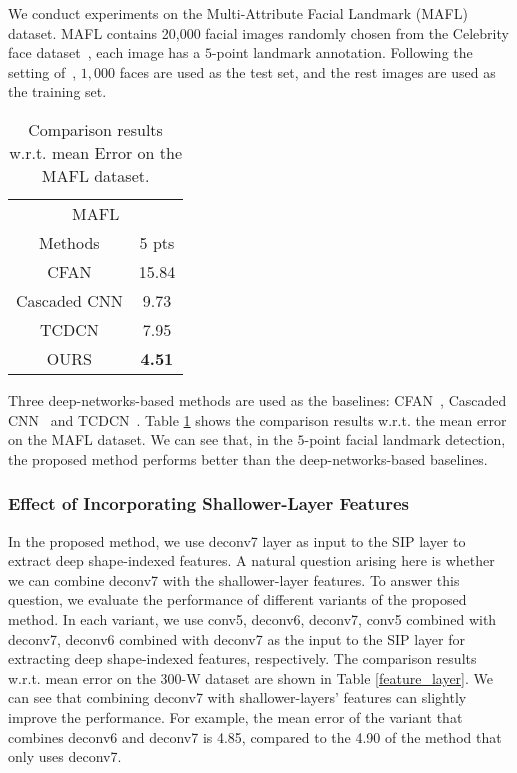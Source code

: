 \documentclass[journal]{IEEEtran}
\begin{document}
We conduct experiments on the Multi-Attribute Facial Landmark (MAFL) dataset. MAFL contains 20,000 facial images randomly chosen from the Celebrity face dataset~\cite{sun2014deep}, each image has a $5$-point landmark annotation. Following the setting of~\cite{zhang2015learning}, $1,000$ faces are used as the test set, and the rest images are used as the training set.

\begin{table}[h]
\small
    \centering \caption{Comparison results w.r.t. mean Error on the MAFL dataset.}
    \begin{tabular}{c c }
        \hline
 \multicolumn{2}{c}{MAFL} \\
Methods & 5 pts \\
        \hline

 CFAN & 15.84 \\

 Cascaded CNN & 9.73   \\

 TCDCN & 7.95   \\
 \hline

 OURS & \textbf{4.51} \\
 \hline
        \end{tabular}
    \label{MAFL}
\end{table}


Three deep-networks-based methods are used as the baselines: CFAN~\cite{zhang2014coarse}, Cascaded CNN~\cite{sun2013deep} and TCDCN~\cite{zhang2015learning}. Table \ref{MAFL} shows the comparison results w.r.t. the mean error on the MAFL dataset. We can see that, in the $5$-point facial landmark detection, the proposed method performs better than the deep-networks-based baselines.

\subsubsection{Effect of Incorporating Shallower-Layer Features}
In the proposed method, we use deconv7 layer as input to the SIP layer to extract deep shape-indexed features. A natural question arising here is whether we can combine deconv7 with the shallower-layer features. To answer this question, we evaluate the performance of different variants of the proposed method. In each variant, we use conv5, deconv6, deconv7, conv5 combined with deconv7, deconv6 combined with deconv7 as the input to the SIP layer for extracting deep shape-indexed features, respectively. The comparison results w.r.t. mean error on the 300-W dataset are shown in Table \ref{feature_layer}. We can see that combining deconv7 with shallower-layers' features can slightly improve the performance. For example, the mean error of the variant that combines deconv6 and deconv7 is 4.85, compared to the 4.90 of the method that only uses deconv7.
\end{document}
